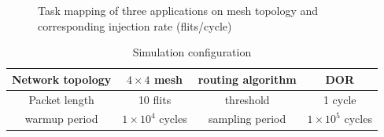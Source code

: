 \documentclass[10pt,conference]{IEEEtran}
\begin{document}
\begin{figure}
  \caption{Task mapping of three applications on mesh topology and corresponding injection rate (flits/cycle)}\label{realistic}
\end{figure}

\begin{table}
  \centering\caption{Simulation configuration}\label{configure}
  \begin{tabular}{|c|c||c|c|}
    \hline
    Network topology & $4\times 4$ mesh  &   routing algorithm & DOR\\
    \hline
    Packet length & 10 flits & threshold & 1 cycle\\
    \hline
    warmup period &   $1\times 10^4$ cycles & sampling period &   $1\times 10^5$ cycles\\
    \hline
    \end{tabular}
\end{table}
\end{document}
